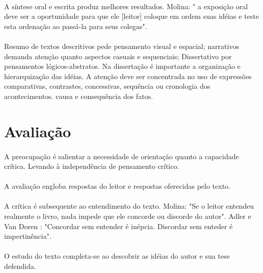 \paragraph{}
A síntese oral e escrita produz melhores resultados. Molina: " a exposição oral deve ser a oportunidade para que ele [leitor] coloque em ordem suas idéias e teste esta ordenação ao passá-la para seus colegas". 

\paragraph{}

Resumo de textos descritivos pede pensamento visual e espacial; narrativos demanda atenção quanto aspectos casuais e sequenciais; Dissertativo por pensamentos lógicos-abstratos. Na dissertação é importante a organização e hierarquização das idéias. A atenção deve ser concentrada no uso de expressões comparativas, contrastes, concessivas, sequência ou cronologia dos acontecimentos. causa e consequência dos fatos.

\section{Avaliação}

\paragraph{}
A preocupação é salientar a necessidade de orientação quanto a capacidade crítica. Levando à independência de pensamento crítico. 

\paragraph{}
A avaliação engloba respostas do leitor e respostas oferecidas pelo texto.

\paragraph{}
A crítica é subsequente ao entendimento do texto. Molina: "Se o leitor entendeu realmente o livro, nada impede que ele concorde ou discorde do autor". Adler e Van Doren : "Concordar sem entender é inépcia. Discordar sem enteder é impertinência".

\paragraph{}
O estudo do texto completa-se ao descobrir as idéias do autor e sua tese defendida.

